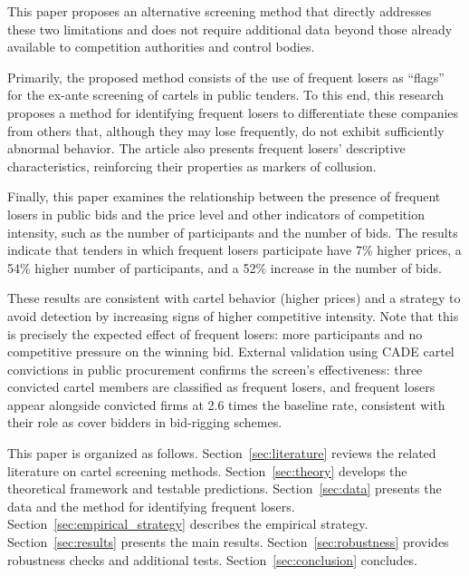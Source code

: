 This paper proposes an alternative screening method that directly addresses these two limitations and does not require additional data beyond those already available to competition authorities and control bodies.

Primarily, the proposed method consists of the use of frequent losers as ``flags'' for the ex-ante screening of cartels in public tenders. To this end, this research proposes a method for identifying frequent losers to differentiate these companies from others that, although they may lose frequently, do not exhibit sufficiently abnormal behavior. The article also presents frequent losers' descriptive characteristics, reinforcing their properties as markers of collusion.

Finally, this paper examines the relationship between the presence of frequent losers in public bids and the price level and other indicators of competition intensity, such as the number of participants and the number of bids. The results indicate that tenders in which frequent losers participate have 7\% higher prices, a 54\% higher number of participants, and a 52\% increase in the number of bids.

These results are consistent with cartel behavior (higher prices) and a strategy to avoid detection by increasing signs of higher competitive intensity. Note that this is precisely the expected effect of frequent losers: more participants and no competitive pressure on the winning bid. External validation using CADE cartel convictions in public procurement confirms the screen's effectiveness: three convicted cartel members are classified as frequent losers, and frequent losers appear alongside convicted firms at 2.6 times the baseline rate, consistent with their role as cover bidders in bid-rigging schemes.

This paper is organized as follows. Section~\ref{sec:literature} reviews the related literature on cartel screening methods. Section~\ref{sec:theory} develops the theoretical framework and testable predictions. Section~\ref{sec:data} presents the data and the method for identifying frequent losers. Section~\ref{sec:empirical_strategy} describes the empirical strategy. Section~\ref{sec:results} presents the main results. Section~\ref{sec:robustness} provides robustness checks and additional tests. Section~\ref{sec:conclusion} concludes.

